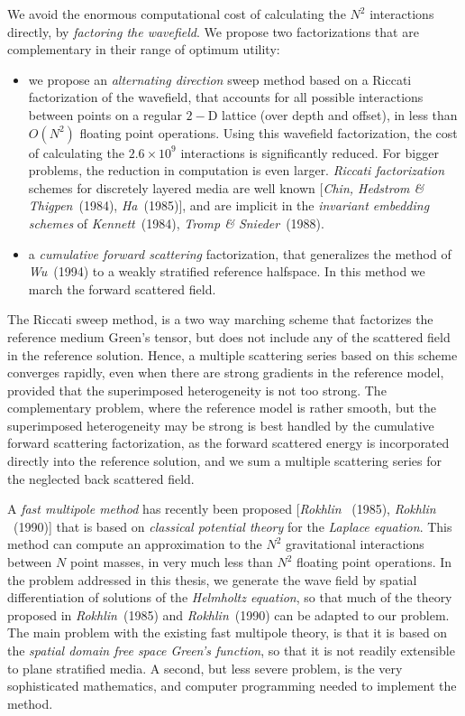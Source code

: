 We avoid the enormous computational cost of calculating the $N^2$ 
interactions directly, by {\em factoring the wavefield\/}. We propose two 
factorizations that are complementary in their range of optimum utility:
\begin{itemize}
\item we propose an {\em alternating direction\/} sweep method
based on a Riccati factorization of the wavefield, that accounts 
for all possible interactions between points on a regular $2-$D lattice 
(over depth and offset), in less than $ O(N^2)$ floating point operations. 
Using this wavefield 
factorization, the cost of calculating the
$2.6 \times 10^9$ interactions is significantly reduced. For 
bigger problems, the reduction in computation is even larger.
{\em Riccati factorization\/} schemes for discretely layered media are well known
[{\em Chin, Hedstrom \& Thigpen\/}~(1984), {\em Ha\/}~(1985)], and are 
implicit in the {\em invariant embedding schemes\/} of {\em 
Kennett\/}~(1984), {\em Tromp \& Snieder\/}~(1988).
\item  a {\em cumulative forward 
scattering \/} factorization, that generalizes the method of {\em Wu\/}~(1994) 
to a weakly stratified reference halfspace. In this method we march the forward 
scattered field.
\end{itemize}
The Riccati sweep method, is a two way marching scheme that factorizes 
the reference medium Green's tensor, but does not include any of the 
scattered field in the reference solution. Hence, a multiple scattering 
series based on this scheme converges rapidly, even when there are strong 
gradients in the reference model, provided that the superimposed 
heterogeneity is not too strong. The complementary problem, where the 
reference model is rather smooth, but the superimposed heterogeneity may 
be strong is best handled by the cumulative forward 
scattering factorization, as the forward scattered energy is incorporated 
directly into the reference solution, and we sum a multiple scattering 
series for the neglected back scattered field.


A {\em fast multipole method\/} has recently been proposed 
[{\em Rokhlin\/} ~(1985), {\em Rokhlin\/} ~(1990)] that is based on {\em 
classical potential theory\/} for the {\em Laplace equation\/}. This 
method can compute an approximation to the $N^2$ gravitational 
interactions between $N$ point masses, in very much less than $N^2$ 
floating point operations. In the 
problem addressed in this thesis, we generate the wave field by 
spatial differentiation of  solutions of the {\em Helmholtz equation\/}, 
so that much of the theory proposed in {\em Rokhlin\/}~(1985) and {\em 
Rokhlin\/}~(1990) can be adapted to our problem. The main problem with the existing fast 
multipole theory, is that it is based on the {\em spatial domain free space
Green's function\/}, so that it is not readily extensible to plane 
stratified media. A second, but  less severe problem, is the very sophisticated 
mathematics, and computer programming needed to implement the method.


